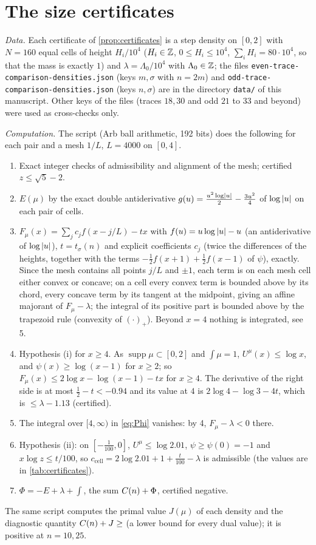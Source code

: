 \section{The size certificates}\label{app:certificates}

\emph{Data.} Each certificate of \cref{prop:certificates} is a step density on $[0,2]$ with $N=160$ equal cells of
height $H_i/10^4$ ($H_i\in\mathbb{Z}$, $0\le H_i\le10^4$, $\sum_iH_i=80\cdot10^4$, so that the mass is exactly $1$) and
$\lambda=\Lambda_0/10^4$ with $\Lambda_0\in\mathbb{Z}$; the files \texttt{even-trace-comparison-densities.json} (keys $m,\sigma$ with
$n=2m$) and \texttt{odd-trace-comparison-densities.json} (keys $n,\sigma$) are in the directory \texttt{data/} of this
manuscript. Other keys of the files (traces $18,30$ and odd $21$ to $33$ and beyond) were used as cross-checks only.

\emph{Computation.} The script  (Arb ball arithmetic, 192 bits) does the following for each pair
and a mesh $1/L$, $L=4000$ on $[0,4]$.
\begin{enumerate}
\item Exact integer checks of admissibility and alignment of the mesh; certified $z\le\sqrt5-2$.
\item $E(\mu)$ by the exact double antiderivative $g(u)=\frac{u^2\log\left\lvert u\right\rvert}2-\frac{3u^2}4$ of $\log\left\lvert u\right\rvert$ on each pair of
cells.
\item $F_\mu(x)=\sum_jc_jf(x-j/L)-tx$ with $f(u)=u\log\left\lvert u\right\rvert-u$ (an antiderivative of $\log\left\lvert u\right\rvert$), $t=t_\sigma(n)$ and explicit
coefficients $c_j$ (twice the differences of the heights, together with the terms $-\frac12f(x+1)+\frac12f(x-1)$ of $\psi$), exactly. Since
the mesh contains all points $j/L$ and $\pm1$, each term is on each mesh cell either convex or concave; on a cell every convex term is bounded above by its chord, every concave
term by its tangent at the midpoint, giving an affine majorant of $F_\mu-\lambda$; the integral of its positive part is
bounded above by the trapezoid rule (convexity of $(\cdot)_+$). Beyond $x=4$ nothing is integrated, see 5.
\item Hypothesis (i) for $x\ge4$. As $\operatorname{supp}\mu\subset[0,2]$ and $\int\mu=1$, $U^\mu(x)\le\log x$, and
$\psi(x)\ge\log(x-1)$ for $x\ge2$; so $F_\mu(x)\le2\log x-\log(x-1)-tx$ for $x\ge4$. The derivative of the right side is at most
$\frac12-t<-0.94$ and its value at $4$ is $2\log4-\log3-4t$, which is $\le\lambda-1.13$ (certified).
\item The integral over $[4,\infty)$ in \eqref{eq:Phi} vanishes: by 4, $F_\mu-\lambda<0$ there.
\item Hypothesis (ii): on $[-\frac1{100},0]$, $U^\mu\le\log2.01$, $\psi\ge\psi(0)=-1$ and $x\log z\le t/100$, so
$c_{\mathrm{cell}}=2\log2.01+1+\frac t{100}-\lambda$ is admissible (the values are in \cref{tab:certificates}).
\item $\Phi=-E+\lambda+\int$, the sum $C(n)+\Phi$, certified negative.
\end{enumerate}
The same script computes the primal value $J(\mu)$ of each density and the diagnostic quantity $C(n)+J\ge$ (a lower bound
for every dual value); it is positive at $n=10,25$.

